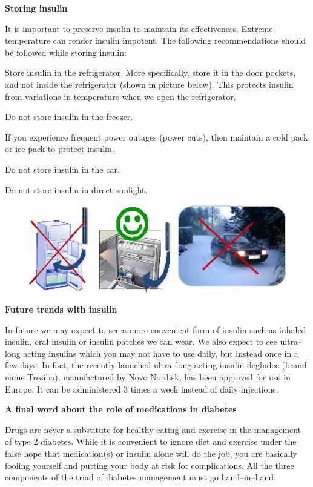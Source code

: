 \textbf{Storing insulin}

It is important to preserve insulin to maintain its effectiveness. Extreme temperature can render insulin impotent. The following recommendations should be followed while storing insulin:

\item Store insulin in the refrigerator. More specifically, store it in the door pockets, and not inside the refrigerator (shown in picture below). This protects insulin from variations in temperature when we open the refrigerator.

 \item Do not store insulin in the freezer.

 \item If you experience frequent power outages (power cuts), then maintain a cold pack or ice pack to protect insulin.

 \item Do not store insulin in the car.

 \item Do not store insulin in direct sunlight.


\begin{figure}
\includegraphics{images/090.jpg}
\end{figure}

\textbf{Future trends with insulin}

In future we may expect to see a more convenient form of insulin such as inhaled insulin, oral insulin or insulin patches we can wear. We also expect to see ultra–long acting insulins which you may not have to use daily, but instead once in a few days. In fact, the recently launched ultra–long acting insulin degludec (brand name Tresiba), manufactured by Novo Nordisk, has been approved for use in Europe. It can be administered 3 times a week instead of daily injections.

\textbf{A final word about the role of medications in diabetes}

Drugs are never a substitute for healthy eating and exercise in the management of type 2 diabetes. While it is convenient to ignore diet and exercise under the false hope that medication(s) or insulin alone will do the job, you are basically fooling yourself and putting your body at risk for complications. All the three components of the triad of diabetes management must go hand–in–hand.

